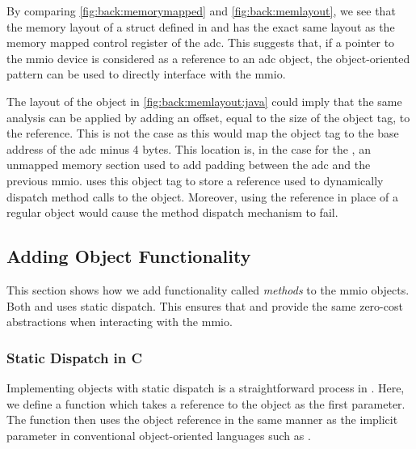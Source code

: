 By comparing \autoref{fig:back:memorymapped} and \autoref{fig:back:memlayout}, we see that the memory layout of a struct defined in {\rust} and {\C} has the exact same layout as the memory mapped control register of the \gls{adc}.
This suggests that, if a pointer to the \gls{mmio} device is considered as a reference to an \gls{adc} object, the object-oriented pattern can be used to directly interface with the \gls{mmio}.

The layout of the {\Java} object in \autoref{fig:back:memlayout:java} could imply that the same analysis can be applied by adding an offset, equal to the size of the object tag, to the reference.
This is not the case as this would map the object tag to the base address of the \gls{adc} minus 4 bytes.
This location is, in the case for the {\gecko}, an unmapped memory section used to add padding between the \gls{adc} and the previous \gls{mmio}.
{\Java} uses this object tag to store a reference used to dynamically dispatch method calls to the object.
Moreover, using the reference in place of a regular {\Java} object would cause the method dispatch mechanism to fail.

\subsection{Adding Object Functionality}

This section shows how we add functionality called \emph{methods} to the \gls{mmio} objects.
Both {\C} and {\rust} uses static dispatch.
This ensures that {\C} and {\rust} provide the same zero-cost abstractions when interacting with the \gls{mmio}.

\subsubsection{Static Dispatch in C}

Implementing objects with static dispatch is a straightforward process in {\C}.
Here, we define a function which takes a reference to the object as the first parameter.
The function then uses the object reference in the same manner as the implicit  parameter in conventional object-oriented languages such as {\Java}.

